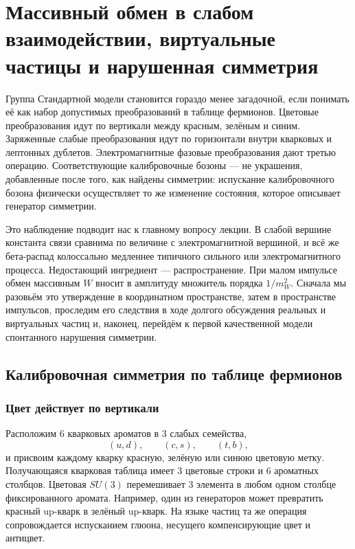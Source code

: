\chapter{Массивный обмен в слабом взаимодействии, виртуальные частицы и нарушенная симметрия}

Группа Стандартной модели становится гораздо менее загадочной, если понимать её как набор допустимых преобразований в таблице фермионов. Цветовые преобразования идут по вертикали между красным, зелёным и синим. Заряженные слабые преобразования идут по горизонтали внутри кварковых и лептонных дублетов. Электромагнитные фазовые преобразования дают третью операцию. Соответствующие калибровочные бозоны — не украшения, добавленные после того, как найдены симметрии: испускание калибровочного бозона физически осуществляет то же изменение состояния, которое описывает генератор симметрии.

Это наблюдение подводит нас к главному вопросу лекции. В слабой вершине константа связи сравнима по величине с электромагнитной вершиной, и всё же бета-распад колоссально медленнее типичного сильного или электромагнитного процесса. Недостающий ингредиент — распространение. При малом импульсе обмен массивным \(W\) вносит в амплитуду множитель порядка \(1/m_W^2\). Сначала мы разовьём это утверждение в координатном пространстве, затем в пространстве импульсов, проследим его следствия в ходе долгого обсуждения реальных и виртуальных частиц и, наконец, перейдём к первой качественной модели спонтанного нарушения симметрии.

\section{Калибровочная симметрия по таблице фермионов}

\subsection{Цвет действует по вертикали}

Расположим 6 кварковых ароматов в 3 слабых семейства,
\begin{equation}
  (u,d),\qquad(c,s),\qquad(t,b),
\end{equation}
и присвоим каждому кварку красную, зелёную или синюю цветовую метку. Получающаяся кварковая таблица имеет 3 цветовые строки и 6 ароматных столбцов. Цветовая \(SU(3)\) перемешивает 3 элемента в любом одном столбце фиксированного аромата. Например, один из генераторов может превратить красный up-кварк в зелёный up-кварк. На языке частиц та же операция сопровождается испусканием глюона, несущего компенсирующие цвет и антицвет.

